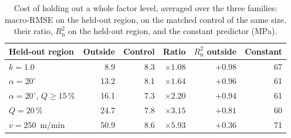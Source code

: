 \begin{table}[t]
\caption[Cost of holding out a whole factor level]{Cost of holding out a whole factor level, averaged over the three families: macro-RMSE on the held-out region, on the matched control of the same size, their ratio, $R^2_{\mathrm{n}}$ on the held-out region, and the constant predictor (MPa).} %
\label{tab:axis}
\centering\small
\begin{tabular}{@{}lrrrrr@{}}
\toprule
Held-out region & Outside & Control & Ratio & $R^2_{\mathrm{n}}$ outside & Constant \\
\midrule
$k=1.0$                              & 8.9  & 8.3 & $\times1.08$ & $+0.98$ & 67 \\
$\alpha=20^\circ$                    & 13.2 & 8.1 & $\times1.64$ & $+0.96$ & 61 \\
$\alpha=20^\circ$, $Q\ge15\,\%$        & 16.1 & 7.3 & $\times2.20$ & $+0.94$ & 61 \\
$Q=20\,\%$                             & 24.7 & 7.8 & $\times3.15$ & $+0.81$ & 60 \\
$v=250$~m/min                        & 50.9 & 8.6 & $\times5.93$ & $+0.36$ & 71 \\
\bottomrule
\end{tabular}
\end{table}

